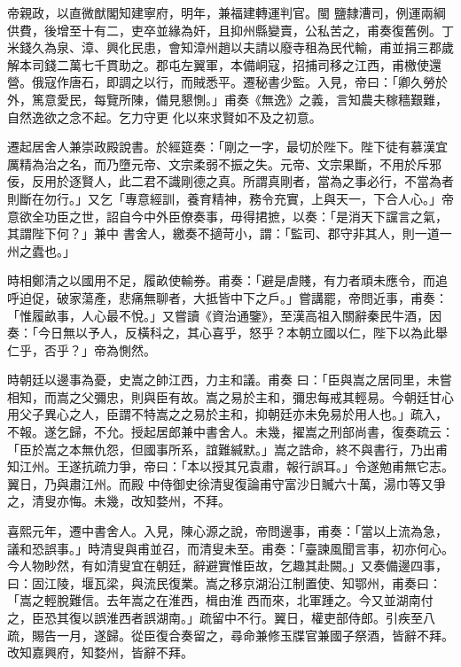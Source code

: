 \begin{pinyinscope}
 帝親政，以直微猷閣知建寧府，明年，兼福建轉運判官。閩
 鹽隸漕司，例運兩綱供費，後增至十有二，吏卒並緣為奸，且抑州縣變賣，公私苦之，甫奏復舊例。丁米錢久為泉、漳、興化民患，會知漳州趙以夫請以廢寺租為民代輸，甫並捐三郡歲解本司錢二萬七千貫助之。郡屯左翼軍，本備峒寇，招捕司移之江西，甫檄使還營。俄寇作唐石，即調之以行，而賊悉平。遷秘書少監。入見，帝曰：「卿久勞於外，篤意愛民，每覽所陳，備見懇惻。」甫奏《無逸》之義，言知農夫稼穡艱難，自然逸欲之念不起。乞力守更
 化以來求賢如不及之初意。



 遷起居舍人兼崇政殿說書。於經筵奏：「剛之一字，最切於陛下。陛下徒有慕漢宜厲精為治之名，而乃墮元帝、文宗柔弱不振之失。元帝、文宗果斷，不用於斥邪佞，反用於逐賢人，此二君不識剛德之真。所謂真剛者，當為之事必行，不當為者則斷在勿行。」又乞「專意經訓，養育精神，務令充實，上與天一，下合人心。」帝意欲全功臣之世，詔自今中外臣僚奏事，毋得捃摭，以奏：「是消天下讜言之氣，其謂陛下何？」兼中
 書舍人，繳奏不擿苛小，謂：「監司、郡守非其人，則一道一州之蠹也。」



 時相鄭清之以國用不足，履畝使輸券。甫奏：「避是虐賤，有力者頑未應令，而追呼迫促，破家蕩產，悲痛無聊者，大抵皆中下之戶。」嘗講罷，帝問近事，甫奏：「惟履畝事，人心最不悅。」又嘗讀《資治通鑒》，至漢高祖入關辭秦民牛酒，因奏：「今日無以予人，反橫科之，其心喜乎，怒乎？本朝立國以仁，陛下以為此舉仁乎，否乎？」帝為惻然。



 時朝廷以邊事為憂，史嵩之帥江西，力主和議。甫奏
 曰：「臣與嵩之居同里，未嘗相知，而嵩之父彌忠，則與臣有故。嵩之易於主和，彌忠每戒其輕易。今朝廷甘心用父子異心之人，臣謂不特嵩之之易於主和，抑朝廷亦未免易於用人也。」疏入，不報。遂乞歸，不允。授起居郎兼中書舍人。未幾，擢嵩之刑部尚書，復奏疏云：「臣於嵩之本無仇怨，但國事所系，誼難緘默。」嵩之誥命，終不與書行，乃出甫知江州。王遂抗疏力爭，帝曰：「本以授其兄袁肅，報行誤耳。」令遂勉甫無它志。翼日，乃與肅江州。而殿
 中侍御史徐清叟復論甫守富沙日贓六十萬，湯巾等又爭之，清叟亦悔。未幾，改知婺州，不拜。



 喜熙元年，遷中書舍人。入見，陳心源之說，帝問邊事，甫奏：「當以上流為急，議和恐誤事。」時清叟與甫並召，而清叟未至。甫奏：「臺諫風聞言事，初亦何心。今人物眇然，有如清叟宜在朝廷，辭避實惟臣故，乞趣其赴闕。」又奏備邊四事，曰：固江陵，堰瓦梁，與流民復業。嵩之移京湖沿江制置使、知鄂州，甫奏曰：「嵩之輕脫難信。去年嵩之在淮西，楫由淮
 西而來，北軍踵之。今又並湖南付之，臣恐其復以誤淮西者誤湖南。」疏留中不行。翼日，權吏部侍郎。引疾至八疏，賜告一月，遂歸。從臣復合奏留之，尋命兼修玉牒官兼國子祭酒，皆辭不拜。改知嘉興府，知婺州，皆辭不拜。




\end{pinyinscope}
